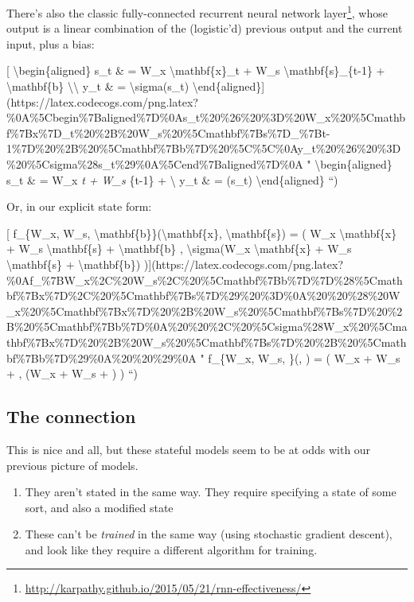 \documentclass[]{article}
\renewcommand{\href}[2]{#2\footnote{\url{#1}}}
\begin{document}
There's also the classic
\href{http://karpathy.github.io/2015/05/21/rnn-effectiveness/}{fully-connected
recurrent neural network layer}, whose output is a linear combination of the
(logistic'd) previous output and the current input, plus a bias:

{[} \textbackslash{}begin\{aligned\} s\_t \& = W\_x
\textbackslash{}mathbf\{x\}\_t + W\_s \textbackslash{}mathbf\{s\}\_\{t-1\} +
\textbackslash{}mathbf\{b\} \textbackslash{}\textbackslash{} y\_t \& =
\textbackslash{}sigma(s\_t)
\textbackslash{}end\{aligned\}{]}(https://latex.codecogs.com/png.latex?\%0A\%5Cbegin\%7Baligned\%7D\%0As\_t\%20\%26\%20\%3D\%20W\_x\%20\%5Cmathbf\%7Bx\%7D\_t\%20\%2B\%20W\_s\%20\%5Cmathbf\%7Bs\%7D\_\%7Bt-1\%7D\%20\%2B\%20\%5Cmathbf\%7Bb\%7D\%20\%5C\%5C\%0Ay\_t\%20\%26\%20\%3D\%20\%5Csigma\%28s\_t\%29\%0A\%5Cend\%7Baligned\%7D\%0A
" \textbackslash{}begin\{aligned\} s\_t \& = W\_x \emph{t + W\_s
}\{t-1\} +  \textbackslash{} y\_t \& = \sigma(s\_t)
\textbackslash{}end\{aligned\} ``)

Or, in our explicit state form:

{[} f\_\{W\_x, W\_s, \textbackslash{}mathbf\{b\}\}(\textbackslash{}mathbf\{x\},
\textbackslash{}mathbf\{s\}) = ( W\_x \textbackslash{}mathbf\{x\} + W\_s
\textbackslash{}mathbf\{s\} + \textbackslash{}mathbf\{b\} ,
\textbackslash{}sigma(W\_x \textbackslash{}mathbf\{x\} + W\_s
\textbackslash{}mathbf\{s\} + \textbackslash{}mathbf\{b\})
){]}(https://latex.codecogs.com/png.latex?\%0Af\_\%7BW\_x\%2C\%20W\_s\%2C\%20\%5Cmathbf\%7Bb\%7D\%7D\%28\%5Cmathbf\%7Bx\%7D\%2C\%20\%5Cmathbf\%7Bs\%7D\%29\%20\%3D\%0A\%20\%20\%28\%20W\_x\%20\%5Cmathbf\%7Bx\%7D\%20\%2B\%20W\_s\%20\%5Cmathbf\%7Bs\%7D\%20\%2B\%20\%5Cmathbf\%7Bb\%7D\%0A\%20\%20\%2C\%20\%5Csigma\%28W\_x\%20\%5Cmathbf\%7Bx\%7D\%20\%2B\%20W\_s\%20\%5Cmathbf\%7Bs\%7D\%20\%2B\%20\%5Cmathbf\%7Bb\%7D\%29\%0A\%20\%20\%29\%0A
" f\_\{W\_x, W\_s, \}(, ) = ( W\_x  +
W\_s  +  , \sigma(W\_x  + W\_s  +
) ) ``)

\hypertarget{the-connection}{%
\subsection{The connection}\label{the-connection}}

This is nice and all, but these stateful models seem to be at odds with our
previous picture of models.

\begin{enumerate}
\def\labelenumi{\arabic{enumi}.}
\tightlist
\item
  They aren't stated in the same way. They require specifying a state of some
  sort, and also a modified state
\item
  These can't be \emph{trained} in the same way (using stochastic gradient
  descent), and look like they require a different algorithm for training.
\end{enumerate}
\end{document}

